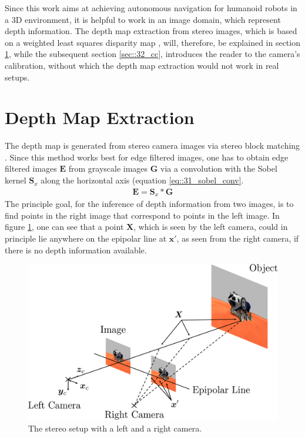 
\label{sec::3_ip}
Since this work aims at achieving autonomous navigation for humanoid robots in a 3D environment, it is helpful to work in an image domain, which represent depth information. The depth map extraction from stereo images, which is based on a weighted least squares disparity map \cite{min2014fast}, will, therefore, be explained in section \ref{sec::31_dm}, while the subsequent section \ref{sec::32_cc}, introduces the reader to the camera's calibration, without which the depth map extraction would not work in real setups.

\FloatBarrier
\section{Depth Map Extraction}
\label{sec::31_dm}
The depth map is generated from stereo camera images via stereo block matching \cite{hamzah2010sum}. Since this method works best for edge filtered images, one has to obtain edge filtered images $\bm{E}$ from grayscale images $\bm{G}$ via a convolution with the Sobel kernel $\bm{S}_x$ along the horizontal axis \cite{sobel2014an} (equation \ref{eq::31_sobel_conv}. 
\begin{align}
	\bm{E} = \bm{S}_x*\bm{G}
	\label{eq::31_sobel_conv}
\end{align}
The principle goal, for the inference of depth information from two images, is to find points in the right image that correspond to points in the left image. In figure \ref{fig::31_stereo_camera}, one can see that a point $\bm{X}$, which is seen by the left camera, could in principle lie anywhere on the epipolar line at $\bm{x}'$, as seen from the right camera, if there is no depth information available. 
\begin{figure}[h!]
	\centering
	\includegraphics[scale=.28]{chapters/03_fundamentals_of_image_processing/img/stereo_camera.png}
	\caption{The stereo setup with a left and a right camera.}
	\label{fig::31_stereo_camera}
\end{figure}
